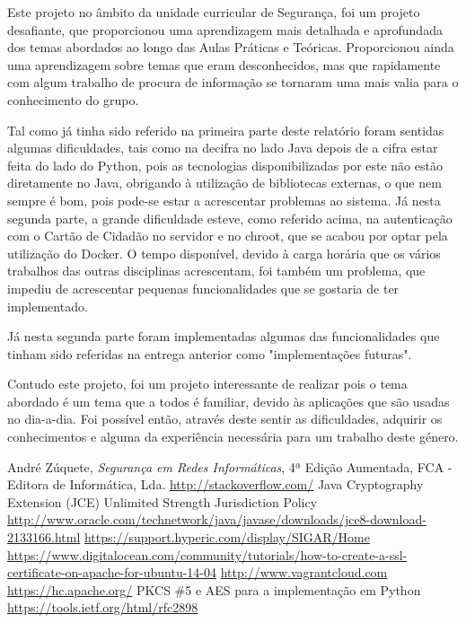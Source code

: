 \documentclass[pdftex,12pt,a4paper]{report}
\begin{document}
Este projeto no âmbito da unidade curricular de Segurança, foi um projeto desafiante, que  proporcionou uma aprendizagem mais detalhada e aprofundada dos temas abordados ao longo das Aulas Práticas e Teóricas. Proporcionou ainda uma aprendizagem sobre temas que eram desconhecidos, mas que rapidamente com algum trabalho de procura de informação se tornaram uma mais valia para o conhecimento do grupo.

Tal como já tinha sido referido na primeira parte deste relatório foram sentidas algumas dificuldades, tais como na decifra no lado Java depois de a cifra estar feita do lado do Python, pois as tecnologias disponibilizadas por este não estão diretamente no Java, obrigando à utilização de bibliotecas externas, o que nem sempre é bom, pois pode-se estar a acrescentar problemas ao sistema.
Já nesta segunda parte, a grande dificuldade esteve, como referido acima, na autenticação com o Cartão de Cidadão no servidor e no chroot, que se acabou por optar pela utilização do Docker. O tempo disponível, devido à carga horária que os vários trabalhos das outras disciplinas acrescentam, foi também um problema, que impediu de acrescentar pequenas funcionalidades que se gostaria de ter implementado.

Já nesta segunda parte foram implementadas  algumas das funcionalidades que tinham sido referidas na entrega anterior como "implementações futuras".

Contudo este projeto, foi um projeto interessante de realizar pois o tema abordado é um tema que a todos é familiar, devido às aplicações que são usadas no dia-a-dia. Foi possível então,  através deste sentir as dificuldades, adquirir os conhecimentos e alguma da experiência necessária para um trabalho deste género.

\renewcommand{\bibname}{Referências}

\begin{thebibliography}{} 
	 André Zúquete, \textit{Segurança em Redes Informáticas}, 4ª Edição Aumentada, FCA - Editora de Informática, Lda.
	 \url{http://stackoverflow.com/}
	 Java Cryptography Extension (JCE) Unlimited Strength Jurisdiction Policy \url{http://www.oracle.com/technetwork/java/javase/downloads/jce8-download-2133166.html}
	 \url{https://support.hyperic.com/display/SIGAR/Home}
	 \url{https://www.digitalocean.com/community/tutorials/how-to-create-a-ssl-certificate-on-apache-for-ubuntu-14-04}
	 \url{http://www.vagrantcloud.com}
	 \url{https://hc.apache.org/}
	 PKCS {\#}5 e AES para a implementação em Python \url{https://tools.ietf.org/html/rfc2898}
\end{thebibliography}
\end{document}
